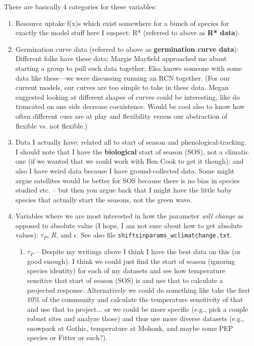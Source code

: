 \documentclass[11pt,a4paper,oneside]{article}
\begin{document}
\noindent There are basically 4 categories for these variables:
\begin{enumerate}
\item Resource uptake f(x)s which exist somewhere for a bunch of species for exactly the model stuff here I suspect: R* (referred to above as {\bf R* data}).
\item Germination curve data (referred to above as {\bf germination curve data}): Different folks have these data; Margie Mayfield approached me about starting a group to pull such data together; Elsa knows someone with some data like these---we were discussing running an RCN together. (For our current models, our curves are too simple to take in these data. Megan suggested looking at different shapes of curves could be interesting, like do truncated on one side decrease coexistence. Would be cool also to know how often different cues are at play and flexibility versus our abstraction of flexible vs. not flexible.) %
\item Data I actually have: related all to start of season and phenological-tracking. I should note that I have the {\bf biological} start of season (SOS), not a climatic one (if we wanted that we could work with Ben Cook to get it though); and also I have weird data because I have ground-collected data. Some might argue satellites would be better for SOS because there is no bias in species studied etc. -- but then you argue back that I might have the little baby species that actually start the seasons, not the green wave.
\item Variables where we are most interested in how the parameter \emph{will change} as opposed to absolute value (I hope, I am not sure about how to get absolute values): \(\tau_{P}\), \(R\), and \(\epsilon\). See also file \verb|shiftsinparams_wclimatchange.txt|.
\begin{enumerate}
\item \(\tau_{P}\) -- Despite my writings above I think I have the best data on this (or good enough). I think we could just find the start of season (ignoring species identity) for each of my datasets and see how temperature sensitive that start of season (SOS) is and use that to calculate a projected response. Alternatively we could do something like take the first 10\% of the community and calculate the temperature sensitivity of that and use that to project... or we could be more specific (e.g., pick a couple robust sites and analyze those) and thus use more diverse datasets (e.g., snowpack at Gothic, temperature at Mohonk, and maybe some PEP species or Fitter or such?).

\end{enumerate}
\end{enumerate}
\end{document}
